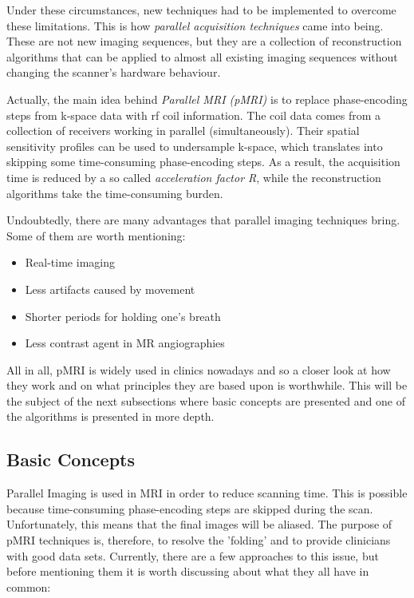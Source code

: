 Under these circumstances, new techniques had to be implemented to overcome these limitations. This is how \textit{parallel acquisition techniques} came into being. These are not new imaging sequences, but they are a collection of reconstruction algorithms that can be applied to almost all existing imaging sequences without changing the scanner's hardware behaviour.  

Actually, the main idea behind \textit{Parallel MRI (pMRI)} is to replace phase-encoding steps from k-space data with rf coil information. The coil data comes from a collection of receivers working in parallel (simultaneously). Their spatial sensitivity profiles can be used to undersample k-space, which translates into skipping some time-consuming phase-encoding steps. As a result, the acquisition time is reduced by a so called \textit{acceleration factor R}, while the reconstruction algorithms take the time-consuming burden. 

Undoubtedly, there are many advantages that parallel imaging techniques bring. Some of them are worth mentioning:
\begin{itemize}
    \item Real-time imaging
    \item Less artifacts caused by movement
    \item Shorter periods for holding one's breath
    \item Less contrast agent in MR angiographies
\end{itemize}

All in all, pMRI is widely used in clinics nowadays and so a closer look at how they work and on what principles they are based upon is worthwhile. This will be the subject of the next subsections where basic concepts are presented and one of the algorithms is presented in more depth.

\subsection{Basic Concepts}
Parallel Imaging is used in MRI in order to reduce scanning time. This is possible because time-consuming phase-encoding steps are skipped during the scan. Unfortunately, this means that the final images will be aliased. The purpose of pMRI techniques is, therefore, to resolve the 'folding' and to provide clinicians with good data sets. Currently, there are a few approaches to this issue, but before mentioning them it is worth discussing about what they all have in common:

